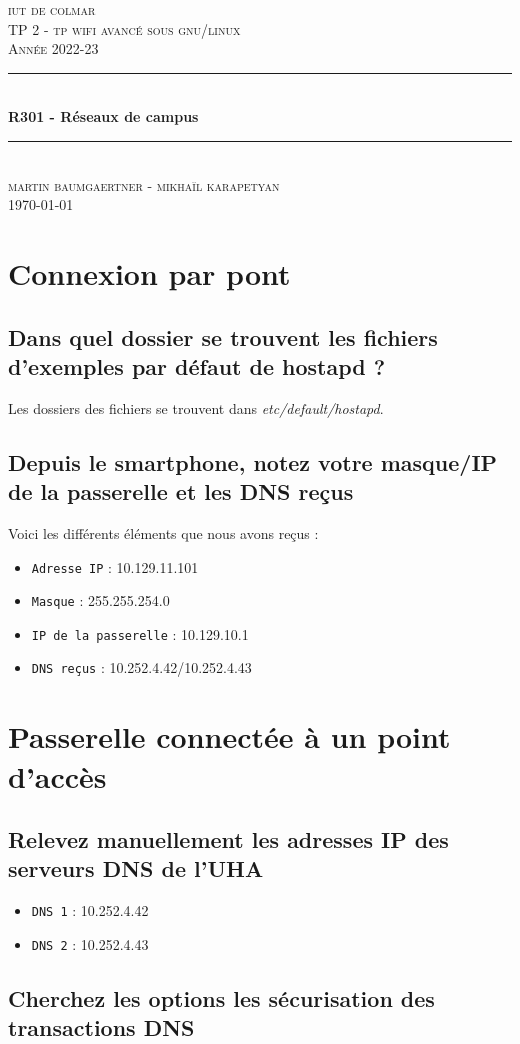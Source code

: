 \documentclass[12pt, a4paper]{article}
\begin{document}
\begin{titlepage}
	\newcommand{\HRule}{\rule{\linewidth}{0.5mm}} 
	\center 
	\textsc{\LARGE iut de colmar}\\[6.5cm] 
	\textsc{\Large TP 2 - tp wifi avancé sous gnu/linux}\\[0.5cm] 
	\textsc{\large Année 2022-23}\\[0.5cm]
	\HRule\\[0.75cm]
	{\huge\bfseries R301 - Réseaux de campus}\\[0.4cm]
	\HRule\\[1.5cm]
	\textsc{\large martin baumgaertner - mikhaïl karapetyan}\\[6.5cm] 

	\vfill\vfill\vfill
	{\large\today} 
	\vfill
\end{titlepage}
\newpage
\tableofcontents
\listoffigures
\listoflistings
\newpage

\section{Connexion par pont}
\subsection{Dans quel dossier se trouvent les fichiers d'exemples par défaut de hostapd ?}

Les dossiers des fichiers se trouvent dans \textit{etc/default/hostapd}.

\subsection{Depuis le smartphone, notez votre masque/IP de la passerelle et les DNS reçus}
Voici les différents éléments que nous avons reçus :\\
\begin{itemize}
    \item \texttt{Adresse IP} : 10.129.11.101
    \item \texttt{Masque} : 255.255.254.0
    \item \texttt{IP de la passerelle} : 10.129.10.1
    \item \texttt{DNS reçus} : 10.252.4.42/10.252.4.43 
\end{itemize}



\section{Passerelle connectée à un point d'accès}

\subsection{Relevez manuellement les adresses IP des serveurs DNS de l'UHA}
\begin{itemize}
    \item \texttt{DNS 1} : 10.252.4.42
    \item \texttt{DNS 2} : 10.252.4.43 
\end{itemize}

\subsection{Cherchez les options les sécurisation des transactions DNS}

    
\end{document}

